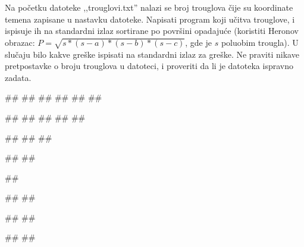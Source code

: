 \begin{Exercise}[label=905]
Na početku datoteke ,,trouglovi.txt'' nalazi se broj trouglova čije su koordinate temena zapisane u nastavku datoteke. Napisati
  program koji učitva trouglove, i ispisuje ih na standardni izlaz
  sortirane po površini opadajuće (koristiti Heronov obrazac: 
  $P = \sqrt{s*(s-a)*(s-b)*(s-c)}$, gde je $s$ poluobim trougla). U slučaju bilo kakve greške ispisati  na standardni izlaz za greške. Ne praviti nikave pretpostavke o broju trouglova u datoteci, i proveriti da li je datoteka ispravno zadata.

\begin{miditest}
\begin{upotreba}{1}
##
##
##
##
##
##

#\naslovInt#
##
##
##
##
\end{upotreba}
\end{miditest}
\begin{minitest}
\begin{upotreba}{2}
##
##
##

#\naslovInt#
##
\end{upotreba}
\end{minitest}

\begin{miditest}
\begin{upotreba}{3}
##

#\naslovInt#
##
\end{upotreba}
\end{miditest}
\begin{minitest}
\begin{upotreba}{2}
##
##

#\naslovInt#
#\izlaz{}#
\end{upotreba}
\end{minitest}

\end{Exercise}

\begin{Answer}[ref=905]
\end{Answer}

